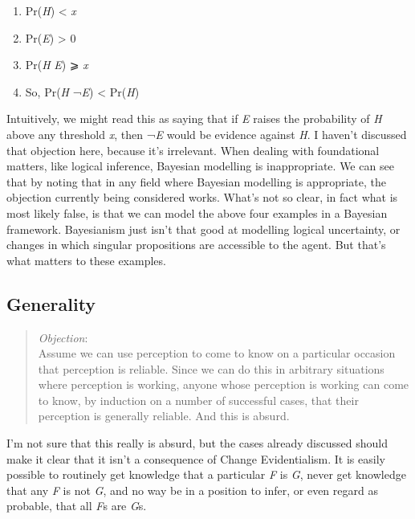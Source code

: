 \documentclass[
  10pt,
  letterpaper,
  twoside]{scrbook}
\providecommand{\tightlist}{%
  \setlength{\itemsep}{0pt}\setlength{\parskip}{0pt}}\usepackage{longtable,booktabs,array}
\begin{document}
\begin{enumerate}
\def\labelenumi{\arabic{enumi}.}
\tightlist
\item
  Pr(\emph{H}) \textless{} \emph{x}
\item
  Pr(\emph{E}) \textgreater{} 0
\item
  Pr(\emph{H} \textbar{} \emph{E}) ⩾ \emph{x}
\item
  So, Pr(\emph{H} \textbar{} ¬\emph{E}) \textless{} Pr(\emph{H})
\end{enumerate}

Intuitively, we might read this as saying that if \emph{E} raises the
probability of \emph{H} above any threshold \emph{x}, then ¬\emph{E}
would be evidence against \emph{H}. I haven't discussed that objection
here, because it's irrelevant. When dealing with foundational matters,
like logical inference, Bayesian modelling is inappropriate. We can see
that by noting that in any field where Bayesian modelling is
appropriate, the objection currently being considered works. What's not
so clear, in fact what is most likely false, is that we can model the
above four examples in a Bayesian framework. Bayesianism just isn't that
good at modelling logical uncertainty, or changes in which singular
propositions are accessible to the agent. But that's what matters to
these examples.

\subsection{Generality}\label{generality}

\begin{quote}
\emph{Objection}:\\
Assume we can use perception to come to know on a particular occasion
that perception is reliable. Since we can do this in arbitrary
situations where perception is working, anyone whose perception is
working can come to know, by induction on a number of successful cases,
that their perception is generally reliable. And this is absurd.
\end{quote}

I'm not sure that this really is absurd, but the cases already discussed
should make it clear that it isn't a consequence of Change
Evidentialism. It is easily possible to routinely get knowledge that a
particular \emph{F} is \emph{G}, never get knowledge that any \emph{F}
is not \emph{G}, and no way be in a position to infer, or even regard as
probable, that all \emph{F}s are \emph{G}s.
\end{document}
